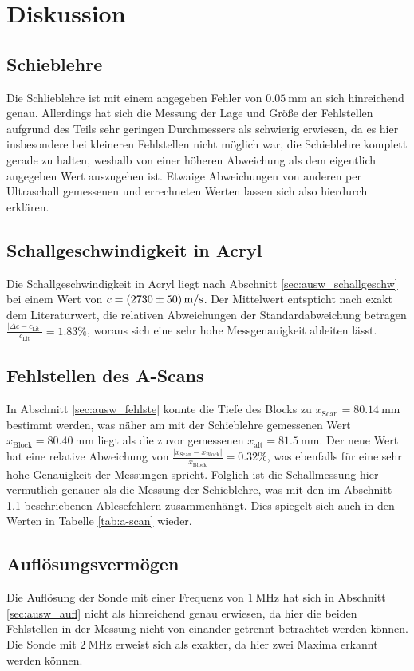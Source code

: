 \section{Diskussion}
\subsection{Schieblehre}
\label{sec:disk_schieb}
Die Schlieblehre ist mit einem angegeben Fehler von $\qty[]{0.05}{\milli\meter}$ an sich hinreichend genau.
Allerdings hat sich die Messung der Lage und Größe der Fehlstellen aufgrund des Teils sehr geringen Durchmessers als schwierig erwiesen, 
da es hier insbesondere bei kleineren Fehlstellen nicht möglich war, die Schieblehre komplett gerade zu halten,
weshalb von einer höheren Abweichung als dem eigentlich angegeben Wert auszugehen ist.
Etwaige Abweichungen von anderen per Ultraschall gemessenen und errechneten Werten lassen sich also hierdurch erklären.

\subsection{Schallgeschwindigkeit in Acryl}
Die Schallgeschwindigkeit in Acryl liegt nach Abschnitt \ref{sec:ausw_schallgeschw} bei einem Wert von $c = \qty{2730 +- 50}{\meter\per\second}$.
Der Mittelwert entspticht nach \cite[]{schall-acryl} exakt dem Literaturwert, die relativen Abweichungen der Standardabweichung betragen
$\frac{|\Delta c - c_\text{Lit}|}{c_\text{Lit}} = \num{1.83} \%$, woraus sich eine sehr hohe Messgenauigkeit ableiten lässt.

\subsection{Fehlstellen des A-Scans}
In Abschnitt \ref{sec:ausw_fehlste} konnte die Tiefe des Blocks zu $x_\text{Scan} = \qty{80.14}{\mm}$ bestimmt werden, 
was näher am mit der Schieblehre gemessenen Wert $x_\text{Block} = \qty{80.40}{\mm}$ liegt als die zuvor gemessenen $x_\text{alt} = \qty{81.5}{\mm}$.
Der neue Wert hat eine relative Abweichung von $\frac{|x_\text{Scan} - x_\text{Block}|}{x_\text{Block}} = \num{0.32} \%$,
was ebenfalls für eine sehr hohe Genauigkeit der Messungen spricht.
Folglich ist die Schallmessung hier vermutlich genauer als die Messung der Schieblehre, was mit den im Abschnitt \ref{sec:disk_schieb}
beschriebenen Ablesefehlern zusammenhängt.
Dies spiegelt sich auch in den Werten in Tabelle \ref{tab:a-scan} wieder.

\subsection{Auflösungsvermögen}
Die Auflösung der Sonde mit einer Frequenz von $\qty[]{1}{\mega\hertz}$ hat sich in Abschnitt \ref{sec:ausw_aufl} nicht als hinreichend 
genau erwiesen, da hier die beiden Fehlstellen in der Messung nicht von einander getrennt betrachtet werden können.
Die Sonde mit $\qty[]{2}{\mega\hertz}$ erweist sich als exakter, da hier zwei Maxima erkannt werden können.

